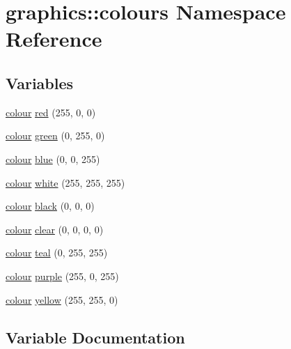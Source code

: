 \hypertarget{namespacegraphics_1_1colours}{}\section{graphics\+:\+:colours Namespace Reference}
\label{namespacegraphics_1_1colours}
\subsection*{Variables}
\begin{DoxyCompactItemize}
\item 
\hyperlink{structgraphics_1_1colour}{colour} \hyperlink{namespacegraphics_1_1colours_a8bc9dc7001921731ff76ca802f1a5b43}{red} (255, 0, 0)
\item 
\hyperlink{structgraphics_1_1colour}{colour} \hyperlink{namespacegraphics_1_1colours_ad3420b0ddbf2d2e15af0e31942a8fdbf}{green} (0, 255, 0)
\item 
\hyperlink{structgraphics_1_1colour}{colour} \hyperlink{namespacegraphics_1_1colours_aa32d426428f03bc3b9f1a22a7e04bc15}{blue} (0, 0, 255)
\item 
\hyperlink{structgraphics_1_1colour}{colour} \hyperlink{namespacegraphics_1_1colours_a77713a7d1bc4cbf45f37942cf43ada26}{white} (255, 255, 255)
\item 
\hyperlink{structgraphics_1_1colour}{colour} \hyperlink{namespacegraphics_1_1colours_a8a798ac0d239095d3ce98415e05d6fc2}{black} (0, 0, 0)
\item 
\hyperlink{structgraphics_1_1colour}{colour} \hyperlink{namespacegraphics_1_1colours_ab04f0c6bf60c34b31307d665b0c69dba}{clear} (0, 0, 0, 0)
\item 
\hyperlink{structgraphics_1_1colour}{colour} \hyperlink{namespacegraphics_1_1colours_aceb03e157ae34836819a37e28605537b}{teal} (0, 255, 255)
\item 
\hyperlink{structgraphics_1_1colour}{colour} \hyperlink{namespacegraphics_1_1colours_a294778a95817cb872322bf4f3f4555ce}{purple} (255, 0, 255)
\item 
\hyperlink{structgraphics_1_1colour}{colour} \hyperlink{namespacegraphics_1_1colours_aeadbc70fa5a266ebc8209f7180a069d6}{yellow} (255, 255, 0)
\end{DoxyCompactItemize}


\subsection{Variable Documentation}

